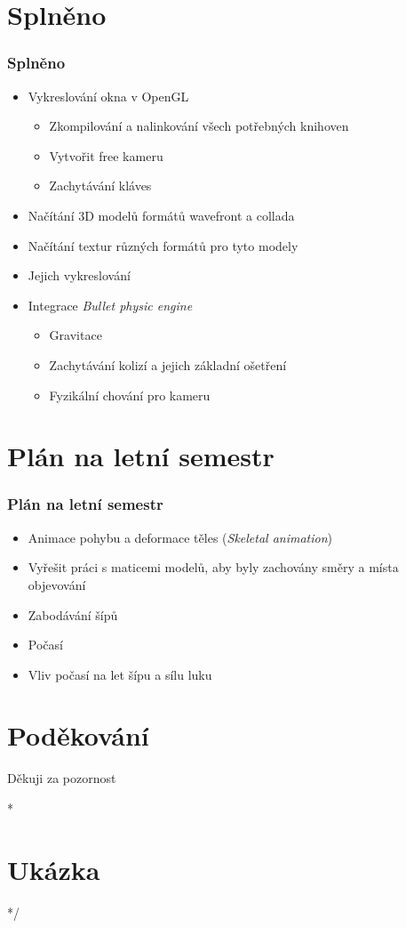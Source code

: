 \documentclass{beamer}
\begin{document}
	\section{Splněno}
		\begin{frame}
			\frametitle{Splněno}
			\begin{itemize}
				\item<1-> Vykreslování okna v OpenGL
					\begin{itemize}
						\item<2-> Zkompilování a nalinkování všech potřebných knihoven
						\item<2-> Vytvořit free kameru
						\item<2-> Zachytávání kláves
					\end{itemize}
				\item<3-> Načítání 3D modelů formátů wavefront a collada
				\item<4-> Načítání textur různých formátů pro tyto modely
				\item<5-> Jejich vykreslování
				\item<6-> Integrace \textit{Bullet physic engine}
					\begin{itemize}
						\item<6-> Gravitace
						\item<6-> Zachytávání kolizí a jejich základní ošetření
						\item<6-> Fyzikální chování pro kameru	
					\end{itemize}	
\end{itemize}
		\end{frame}
	\section{Plán na letní semestr}
		\begin{frame}
			\frametitle{Plán na letní semestr}	
			\begin{itemize}[<+->]
				\item Animace pohybu a deformace těles (\textit{Skeletal animation})
				\item Vyřešit práci s maticemi modelů, aby byly zachovány směry a místa objevování
				\item Zabodávání šípů
				\item Počasí
				\item Vliv počasí na let šípu a sílu luku	
			\end{itemize}
		\end{frame}
	\section{Poděkování}
	\begin{frame}	
		\begin{center}
				{\huge Děkuji za pozornost}
		\end{center}
	
	\end{frame}
\/*	\section{Ukázka}
		\begin{frame}
		\end{frame}
	*/
\end{document}
